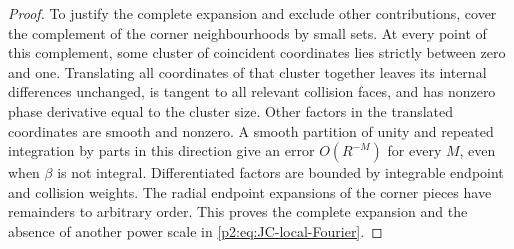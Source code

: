 \documentclass[11pt,a4paper]{article}
\theoremstyle{definition}
\theoremstyle{remark}
\numberwithin{equation}{section}
\begin{document}
\begin{proof}
To justify the complete expansion and exclude other contributions,
cover the complement of the corner neighbourhoods by small sets.
At every point of this complement, some cluster of coincident
coordinates lies strictly between zero and one.  Translating all
coordinates of that cluster together leaves its internal differences
unchanged, is tangent to all relevant collision faces, and has
nonzero phase derivative equal to the cluster size.  Other factors
in the translated coordinates are smooth and nonzero.  A smooth
partition of unity and repeated integration by parts in this
direction give an error $O(R^{-M})$ for every $M$, even when
$\beta$ is not integral.  Differentiated factors are bounded by
integrable endpoint and collision weights.  The radial endpoint
expansions of the corner pieces have remainders to arbitrary order.
This proves the complete expansion and the absence of another power
scale in \eqref{p2:eq:JC-local-Fourier}.
\end{proof}
\end{document}
